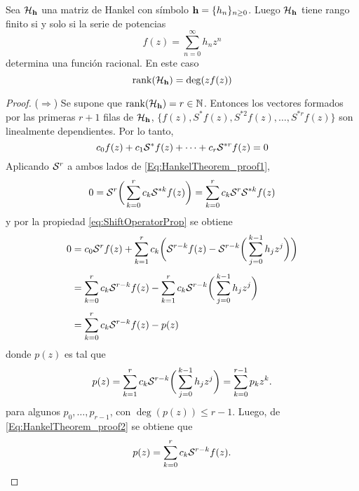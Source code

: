 		\begin{theorem}\label{Th:Kronecker}
			Sea $\mathcal{H}_{\mathbf{h}}$ una matriz de Hankel con símbolo $\mathbf{h} = \{h_n\}_{n\ge 0}$. Luego $\mathcal{H}_{\mathbf{h}}$ tiene rango finito si y solo si la serie de potencias 
            \[f(z) = \sum_{n=0}^\infty h_nz^n\] 
            determina una función racional. En este caso
			\begin{equation}
				\mathrm{rank}(\mathcal{H}_{\mathbf{h}})=\deg(z f(z))
				\label{Eq:HankelTheorem1}
			\end{equation}
		\end{theorem}
		\begin{proof}
			($\Rightarrow$) Se supone que $\mathrm{rank}(\mathcal{H}_{\mathbf{h}})=r\in\mathbb{N}$. Entonces los vectores formados por las primeras $r+1$ filas de $\mathcal{H}_{\mathbf{h}}$,  $\big\{f(z),S^*f(z),S^{*2}f(z),\ldots,S^{*r}f(z)\big\}$ son linealmente dependientes. Por lo tanto, 
			\begin{equation}
		      	c_0f(z) + c_1\mathcal{S}^*f(z)+\cdots+c_r\mathcal{S}^{*r}f(z) = 0
			    \label{Eq:HankelTheorem_proof1}
			\end{equation}
			Aplicando $\mathcal{S}^r$ a ambos lados de \eqref{Eq:HankelTheorem_proof1}, 
			\begin{equation}
			0 = \mathcal{S}^r\bigg(\sum_{k=0}^rc_k\mathcal{S}^{*k}f(z)\bigg) = \sum_{k=0}^rc_k\mathcal{S}^{r}\mathcal{S}^{*k}f(z) 
			\label{Eq:HankelTheorem_proof2.1}
			\end{equation}
			y por la propiedad \eqref{eq:ShiftOperatorProp} se obtiene
			\begin{equation}
				\begin{aligned}
				    0 & =c_0\mathcal{S}^rf(z) + \sum_{k=1}^{r}c_k\bigg(\mathcal{S}^{r-k}f(z)-\mathcal{S}^{r-k}\bigg(\sum_{j=0}^{k-1}h_jz^j\bigg)\bigg) \\[0.3em]
				    & = \sum_{k=0}^{r}c_k\mathcal{S}^{r-k}f(z)-\sum_{k=1}^{r}c_k\mathcal{S}^{r-k}\bigg(\sum_{j=0}^{k-1}h_jz^j\bigg)\\[0.3em] & = \sum_{k=0}^rc_k\mathcal{S}^{r-k}f(z) - p(z) 
				\end{aligned}
				\label{Eq:HankelTheorem_proof2}
			\end{equation}
			donde $p(z)$ es tal que  
			\begin{equation}
				p(z) = \sum_{k=1}^{r}c_k\mathcal{S}^{r-k}\bigg(\sum_{j=0}^{k-1}h_jz^j\bigg) =\sum_{k=0}^{r-1}p_kz^k.
				\label{Eq:HankelTheorem_proof3}
			\end{equation}
			para algunos $p_0,\ldots,p_{r-1}$, con $\deg (p(z))\le r-1$. Luego, de \eqref{Eq:HankelTheorem_proof2} se obtiene que 
			\[p(z) = \sum_{k=0}^{r}c_k\mathcal{S}^{r-k}f(z).\]
			

\end{proof}
